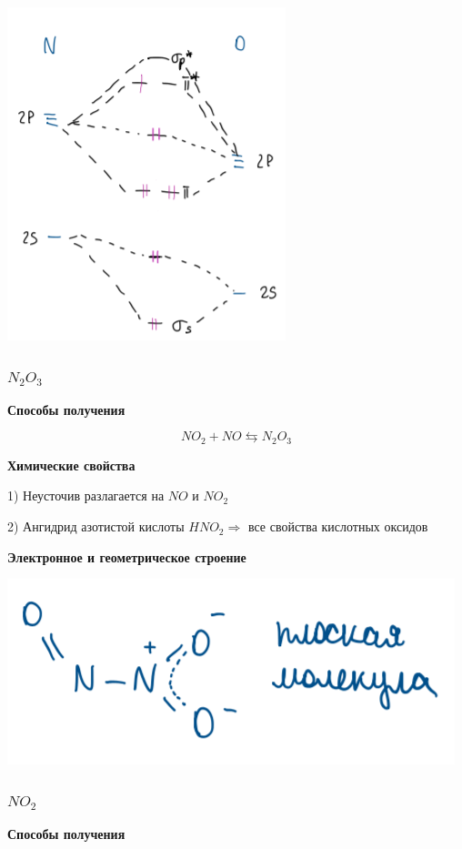 \includegraphics{images/8v8.png}

\subsubsection*{$N_2O_3$}

\textbf{Способы получения}

$$NO_2 + NO \leftrightarrows N_2O_3$$

\textbf{Химические свойства}

1) Неусточив разлагается на $NO$ и $NO_2$

2) Ангидрид азотистой кислоты $HNO_2 \Rightarrow$ все свойства кислотных оксидов

\textbf{Электронное и геометрическое строение}

\includegraphics{images/8v9.png}

\subsubsection*{$NO_2$}

\textbf{Способы получения}

